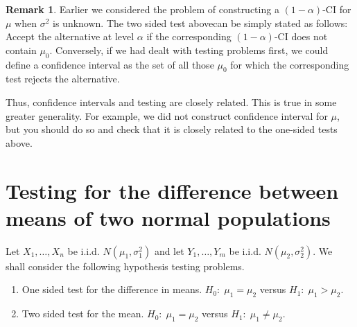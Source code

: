 \documentclass[preprint,  11pt]{amsart}
\theoremstyle{plain} %
\theoremstyle{definition} %
\newtheorem{remark}[theorem]{Remark}
\begin{document}
\begin{remark} Earlier we considered the problem of constructing a $(1-\alpha)$-CI for $\mu$ when ${\sigma}^{2}$ is unknown. The two sided test abovecan be simply stated as follows: Accept the alternative at level $\alpha$ if the corresponding $(1-\alpha)$-CI does not contain $\mu_{0}$. Conversely, if we had dealt with testing problems first, we could define a confidence interval as the set of all those $\mu_{0}$ for which the corresponding test rejects the alternative.

Thus, confidence intervals and testing are closely related. This is true in some greater generality. For example, we did not construct confidence interval for $\mu$, but you should do so and check that it is closely related to the one-sided tests above.
\end{remark}

\section{Testing for the difference between means of two normal populations}
Let $X_{1},\ldots ,X_{n}$ be i.i.d. $N(\mu_{1},{\sigma}_{1}^{2})$ and let $Y_{1},\ldots ,Y_{m}$ be i.i.d. $N(\mu_{2},{\sigma}_{2}^{2})$. We shall consider the following  hypothesis testing problems.

\begin{enumerate}\setlength\itemsep{6pt}
\item One sided test for the difference in means. $H_{0}:\; \mu_{1}=\mu_{2}$ versus $H_{1}: \; \mu_{1}>\mu_{2}$.
\item Two sided test for the mean.  $H_{0}:\; \mu_{1}=\mu_{2}$ versus $H_{1}: \; \mu_{1}\not=\mu_{2}$.
\end{enumerate}
\end{document}
